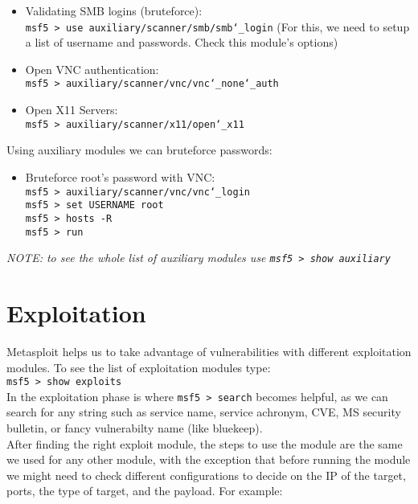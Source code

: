 \documentclass[twocolumn]{article}
\begin{document}
\begin{itemize}
    \setlength\itemsep{-0.25em}
    \item Validating SMB logins (bruteforce):\\
    \indent\texttt{msf5 > use auxiliary/scanner/smb/smb\char`\_login} (For this, we need to setup a list of username and passwords. Check this module's options)
    \item Open VNC authentication:\\
    \indent\texttt{msf5 > auxiliary/scanner/vnc/vnc\char`\_none\char`\_auth}
    \item Open X11 Servers:\\
    \indent\texttt{msf5 > auxiliary/scanner/x11/open\char`\_x11}
\end{itemize}

\noindent Using auxiliary modules we can bruteforce passwords:

\begin{itemize}
    \item Bruteforce root's password with VNC:\\
    \indent\texttt{msf5 > auxiliary/scanner/vnc/vnc\char`\_login} \\
    \indent\texttt{msf5 > set USERNAME root} \\
    \indent\texttt{msf5 > hosts -R} \\
    \indent\texttt{msf5 > run}
\end{itemize}

\noindent \textit{NOTE: to see the whole list of auxiliary modules use \texttt{msf5 > show auxiliary}}

\section{Exploitation}

\noindent Metasploit helps us to take advantage of vulnerabilities with different exploitation modules. To see the list of exploitation modules type: \\

\indent\texttt{msf5 > show exploits} \\

\noindent In the exploitation phase is where \texttt{msf5 > search} becomes helpful, as we can search for any string such as service name, service achronym, CVE, MS security bulletin, or fancy vulnerabilty name (like bluekeep). \\

\noindent After finding the right exploit module, the steps to use the module are the same we used for any other module, with the exception that before running the module we might need to check different configurations to decide on the IP of the target, ports, the type of target, and the payload. For example:
\end{document}
